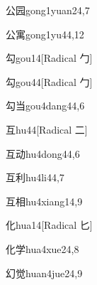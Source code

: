 \begin{verbete}{公园}{gong1yuan2}{4,7}
\end{verbete}

\begin{verbete}{公寓}{gong1yu4}{4,12}
\end{verbete}

\begin{verbete}{勾}{gou1}{4}[Radical ⼓]
\end{verbete}

\begin{verbete}{勾}{gou4}{4}[Radical ⼓]
\end{verbete}

\begin{verbete}{勾当}{gou4dang4}{4,6}
\end{verbete}

\begin{verbete}{互}{hu4}{4}[Radical ⼆]
\end{verbete}

\begin{verbete}{互动}{hu4dong4}{4,6}
\end{verbete}

\begin{verbete}{互利}{hu4li4}{4,7}
\end{verbete}

\begin{verbete}{互相}{hu4xiang1}{4,9}
\end{verbete}

\begin{verbete}{化}{hua1}{4}[Radical 匕]
\end{verbete}

\begin{verbete}{化学}{hua4xue2}{4,8}
\end{verbete}

\begin{verbete}{幻觉}{huan4jue2}{4,9}
\end{verbete}

